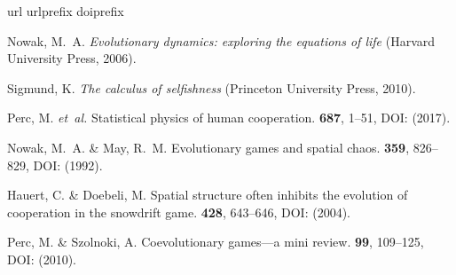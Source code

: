 \documentclass[fleqn,10pt]{wlscirep}
\begin{document}
\begin{thebibliography}{10}
\expandafter\ifx\csname url\endcsname\relax
  \def\url#1{\texttt{#1}}\fi
\expandafter\ifx\csname urlprefix\endcsname\relax\def\urlprefix{URL }\fi
\expandafter\ifx\csname doiprefix\endcsname\relax\def\doiprefix{DOI: }\fi
\providecommand{\bibinfo}[2]{#2}
\providecommand{\eprint}[2][]{\url{#2}}

\bibinfo{author}{Nowak, M.~A.}
\newblock \emph{\bibinfo{title}{Evolutionary dynamics: exploring the equations of life}} (\bibinfo{publisher}{Harvard University Press}, \bibinfo{year}{2006}).

\bibinfo{author}{Sigmund, K.}
\newblock \emph{\bibinfo{title}{The calculus of selfishness}} (\bibinfo{publisher}{Princeton University Press}, \bibinfo{year}{2010}).

\bibinfo{author}{Perc, M.} \emph{et~al.}
\newblock \bibinfo{journal}{\bibinfo{title}{Statistical physics of human cooperation}}.
 \textbf{\bibinfo{volume}{687}}, \bibinfo{pages}{1--51}, DOI:\href{https://doi.org/10.1016/j.physrep.2017.05.004}{} (\bibinfo{year}{2017}).

\bibinfo{author}{Nowak, M.~A.} \& \bibinfo{author}{May, R.~M.}
\newblock \bibinfo{journal}{\bibinfo{title}{Evolutionary games and spatial chaos}}.
 \textbf{\bibinfo{volume}{359}}, \bibinfo{pages}{826--829}, DOI:\href{https://doi.org/10.1038/359826a0}{} (\bibinfo{year}{1992}).

\bibinfo{author}{Hauert, C.} \& \bibinfo{author}{Doebeli, M.}
\newblock \bibinfo{journal}{\bibinfo{title}{Spatial structure often inhibits the evolution of cooperation in the snowdrift game}}.
 \textbf{\bibinfo{volume}{428}}, \bibinfo{pages}{643--646}, DOI:\href{https://doi.org/10.1038/nature02360}{} (\bibinfo{year}{2004}).

\bibinfo{author}{Perc, M.} \& \bibinfo{author}{Szolnoki, A.}
\newblock \bibinfo{journal}{\bibinfo{title}{Coevolutionary games---a mini review}}.
 \textbf{\bibinfo{volume}{99}}, \bibinfo{pages}{109--125}, DOI:\href{https://doi.org/10.1016/j.biosystems.2009.10.003}{} (\bibinfo{year}{2010}).


\end{thebibliography}
\end{document}
